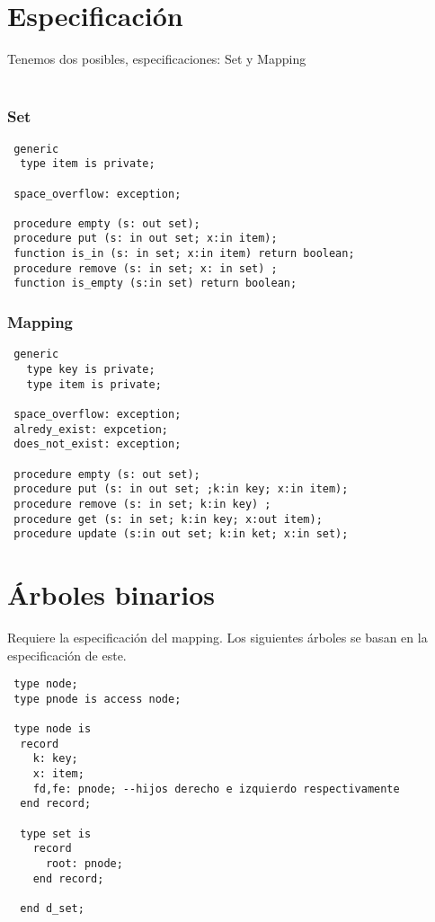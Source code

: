 \documentclass[a4paper,10pt]{book}
\begin{document}
\section{Especificación}
Tenemos dos posibles, especificaciones: Set y Mapping\\\
\subsubsection{Set}
\begin{lstlisting}
 generic
  type item is private;
  
 space_overflow: exception;
 
 procedure empty (s: out set);
 procedure put (s: in out set; x:in item);
 function is_in (s: in set; x:in item) return boolean;
 procedure remove (s: in set; x: in set) ;
 function is_empty (s:in set) return boolean;
\end{lstlisting}

\subsubsection{Mapping}
\begin{lstlisting}
 generic
   type key is private;
   type item is private;
  
 space_overflow: exception;
 alredy_exist: expcetion;
 does_not_exist: exception;
 
 procedure empty (s: out set);
 procedure put (s: in out set; ;k:in key; x:in item);
 procedure remove (s: in set; k:in key) ;
 procedure get (s: in set; k:in key; x:out item);
 procedure update (s:in out set; k:in ket; x:in set);
\end{lstlisting}

\pagebreak

\section{Árboles binarios}
Requiere la especificación del mapping. Los siguientes árboles se basan en la especificación de este.
\begin{lstlisting}
 type node;
 type pnode is access node;
 
 type node is
  record
    k: key;
    x: item;
    fd,fe: pnode; --hijos derecho e izquierdo respectivamente
  end record;
  
  type set is
    record
      root: pnode;
    end record;
  
  end d_set;
\end{lstlisting}
\end{document}
